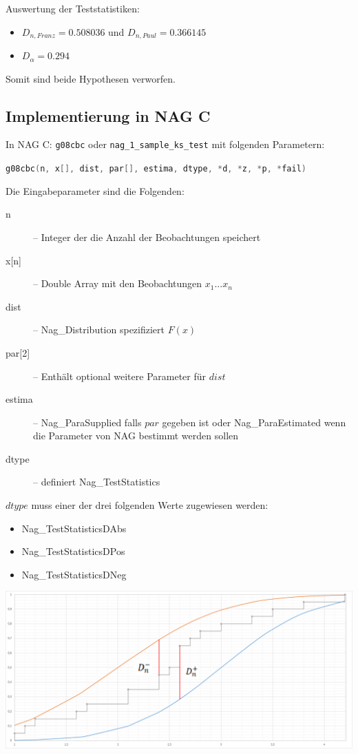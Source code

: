 \documentclass{beamer}
\begin{document}
\begin{frame}{\insertsubsection}
Auswertung der Teststatistiken:\\
	\begin{itemize}
		\item $D_{n,Franz}=0.508036$ und $D_{n,Paul}=0.366145$
		\item $D_\alpha=0.294$
	\end{itemize}
Somit sind beide Hypothesen verworfen.
\end{frame}

\subsection{Implementierung in NAG C}
\begin{frame}[fragile]{\insertsubsection}
In NAG C: \lstinline[language=C++]$g08cbc$ oder \lstinline[language=C++]$nag_1_sample_ks_test$ mit folgenden Parametern:\\
\begin{center}\lstinline[language=C++]$g08cbc(n, x[], dist, par[], estima, dtype, *d, *z, *p, *fail)$\end{center}
Die Eingabeparameter sind die Folgenden:
	\begin{description}
		\item[n] -- Integer der die Anzahl der Beobachtungen speichert
		\item[x{[n]}] -- Double Array mit den Beobachtungen $x_1...x_n$
		\item[dist] -- Nag\_Distribution spezifiziert $F(x)$
		\item[par{[2]}] -- Enthält optional weitere Parameter für $dist$
		\item[estima] -- Nag\_ParaSupplied falls $par$ gegeben ist oder Nag\_ParaEstimated wenn die Parameter von NAG bestimmt werden sollen
		\item[dtype] -- definiert Nag\_TestStatistics
	\end{description}
\end{frame}

\begin{frame}[fragile]{\insertsubsection}
$dtype$ muss einer der drei folgenden Werte zugewiesen werden:
	\begin{itemize}
		\item Nag\_TestStatisticsDAbs
		\item Nag\_TestStatisticsDPos
		\item Nag\_TestStatisticsDNeg
	\end{itemize}
	\includegraphics[width=1.0\textwidth]{figures/diagramKSd-d+.png}
\end{frame}
\end{document}
